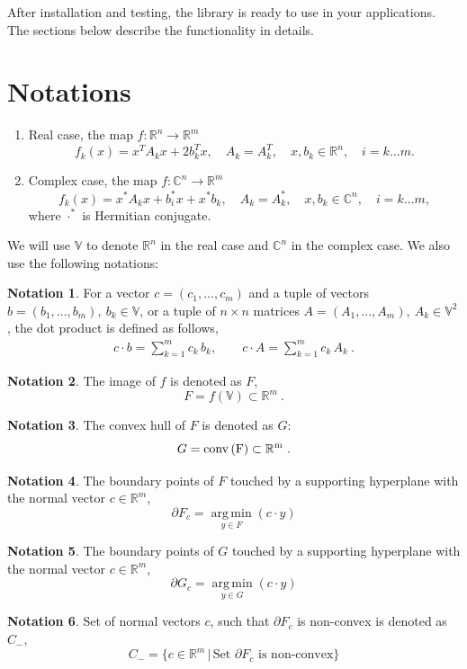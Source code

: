 \documentclass[a4paper]{article}
\DeclareMathOperator*{\argmin}{arg\,min}
\newcommand{\R}{\mathbb{R}}
\newcommand{\conv}{\rm{conv}\,}
\theoremstyle{definition}
\newtheorem{definition}{Notation}[]
\begin{document}
After installation and testing, the library is ready to use in your applications. The sections below describe the functionality in details.

\newpage

\section*{Notations}
\begin{enumerate}
\item Real case, the map $f\colon \mathbb{R}^n\to\mathbb{R}^m$
\begin{equation}
f_k(x)=x^TA_k x+2b_k^Tx ,\quad A_k=A_k^T ,\quad x, b_k\in \mathbb{R}^n ,\quad i=k\dots m . \label{real}
\end{equation}
\item Complex case, the map $f\colon \mathbb{C}^n\to\mathbb{R}^m$
\begin{equation}
f_k(x)=x^*A_k x+b_i^*x+x^*b_k ,\quad A_k=A_k^* ,\quad x, b_k\in \mathbb{C}^n ,\quad i=k\dots m ,\label{complex}
\end{equation}
where $\cdot^*$ is Hermitian conjugate.
\end{enumerate}

We will use $\mathbb{V}$ to denote $\mathbb{R}^n$ in the real case and $\mathbb{C}^n$ in the  complex case.
We also use the following notations:\\

\theoremstyle{definition}
\begin{definition}
For a vector $c=(c_1,...,c_m)$ and a tuple of vectors $b=(b_1,...,b_m), \ b_k \in \mathbb{V}$, or a tuple of $n\times n$ matrices $A=(A_1,...,A_m), \  A_k\in \mathbb{V}^2$, the dot product is defined as follows,
\begin{eqnarray}
c\cdot b=\sum\limits_{k=1}^m c_k\, b_k ,\qquad
c\cdot A=\sum\limits_{k=1}^m c_k\, A_k\ . \nonumber
\end{eqnarray}
\end{definition}

\begin{definition}
The image of $f$ is denoted as $F$,
	$$F=f(\mathbb{V})\subset \mathbb{R}^m\ .$$
\end{definition}
\begin{definition} The convex hull of $F$ is denoted as $G$:
	$$G=\conv (F)\subset \mathbb{R}^m\ .$$
\end{definition}
\begin{definition} The boundary points of $F$ touched by a supporting hyperplane with the normal vector $c\in\mathbb{R}^m$,
	$$\partial F_c=\argmin\limits_{y\in F}(c\cdot y)$$
\end{definition}
\begin{definition} The boundary points of $G$ touched by a supporting hyperplane with the normal vector $c\in\mathbb{R}^m$,
	$$\partial G_c=\argmin\limits_{y\in G}(c\cdot y)$$
\end{definition}
\begin{definition}\label{ex:c_minus}
	Set of normal vectors $c$, such that $\partial F_c$ is non-convex is denoted as $C_-$,
	$$C_-=\{c\in\R^m\,\big|\,\mbox{Set }\partial F_c\mbox{ is non-convex}\}$$
\end{definition}
\end{document}
